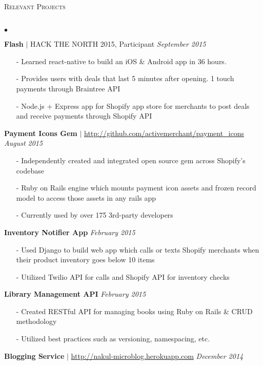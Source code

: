 \documentclass[10pt]{article}
\newcommand{\lineunder}{\vspace*{-8pt} \\ \hspace*{-18pt} \hrulefill \\}
\newcommand{\header}[1]{{\hspace*{-15pt}\vspace*{6pt} \textsc{#1}} \vspace*{-6pt} \lineunder}
\newenvironment{achievements}{\begin{list}{$\bullet$}{\topsep 0pt \itemsep -1.5pt \leftmargin 5pt}}{\vspace*{4pt}\end{list}}
\begin{document}
\header{\normalsize Relevant Projects}
\begin{achievements}
\def\UrlFont{\em}
\item \textbf{Flash} {$|$ \scriptsize HACK THE NORTH 2015, Participant}  \hfill \textit {September 2015}
\begin{itemize}
\item[-]Learned react-native to build an iOS \& Android app in 36 hours. 
\item[-]Provides users with deals that last 5 minutes after opening. 1 touch payments through Braintree API
\item[-]Node.js + Express app for Shopify app store for merchants to post deals and receive payments through Shopify API
\end{itemize}
\item \textbf{Payment Icons Gem} $|$ \url{http://github.com/activemerchant/payment_icons} \hfill \textit {August 2015}
\begin{itemize}
\item[-]Independently created and integrated open source gem across Shopify's codebase
\item[-]Ruby on Rails engine which mounts payment icon assets and frozen record model to access those assets in any rails app
\item[-]Currently used by over 175 3rd-party developers
\end{itemize}
\item \textbf{Inventory Notifier App}  \hfill \textit {February 2015}
\begin{itemize}
\item[-]Used Django to build web app which calls or texts Shopify merchants when their product inventory goes below 10 items
\item[-]Utilized Twilio API for calls and Shopify API for inventory checks
\end{itemize}
\item \textbf{Library Management API}  \hfill \textit {February 2015}
\begin{itemize}
\item[-]Created RESTful API for managing books using Ruby on Rails \& CRUD methodology
\item[-]Utilized best practices such as versioning, namespacing, etc.
\end{itemize}
\item \textbf{Blogging Service} $|$ \url{http://nakul-microblog.herokuapp.com} \hfill \textit {December 2014}
\begin{itemize}

\end{itemize}
\end{achievements}
\end{document}
